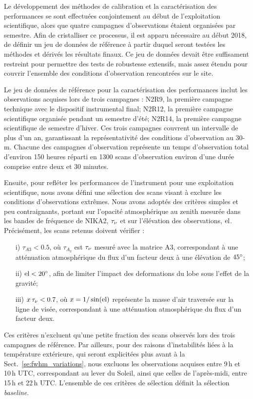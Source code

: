 Le développement des méthodes de calibration et la caractérisation
des performances se sont effectuées conjointement au début de
l'exploitation scientifique, alors que quatre campagnes d'observations
étaient organisées par semestre. Afin de cristalliser ce processus, il
est apparu nécessaire au début 2018, de définir un jeu de données de
référence à partir duquel seront testées les méthodes et dérivés les
résultats finaux. Ce jeu de données devait être suffisament restreint
pour permettre des tests de robustesse extensifs, mais assez étendu
pour couvrir l'ensemble des conditions d'observation rencontrées sur
le site.

Le jeu de données de référence pour la caractérisation des
performances inclut les observations acquises lors de trois campagnes
: N2R9, la première campagne technique avec le dispositif
instrumental final; N2R12, la première campagne scientifique
organisée pendant un semestre d'été; N2R14, la première campagne
scientifique de semestre d'hiver. Ces trois campagnes couvrent un
intervalle de plus d'un an, garantissant la représentativité des
conditions d'observation au 30-m. Chacune des campagnes d'observation
représente un temps d'observation total d'environ 150 heures réparti
en 1300 scans d'observation environ d'une durée comprise entre
deux et 30 minutes.

Ensuite, pour refléter les performances de l'instrument pour une
exploitation scientifique, nous avons défini une sélection des scans
visant à exclure les conditions d'observations extrêmes. Nous avons
adoptés des critères simples et peu contraignants, portant sur l'opacité
atmosphérique au zenith mesurée dans les bandes de fréquence de NIKA2,
$\tau_{\nu}$ et sur l'élévation des observations, $\rm{el}$. Précisément,
les scans retenus doivent vérifier :
\begin{itemize}
  \item[i)]{$\tau_{A3} < 0.5$, où $\tau_{A_3}$ est $\tau_{\nu}$ mesuré
    avec la matrice A3, correspondant à une atténuation atmosphérique
    du flux d'un facteur deux à une élévation de $45^{\circ}$;}
  \item[ii)]{$\rm{el} < 20^{\circ}$, afin de limiter l'impact des deformations du lobe
    sous l'effet de la gravité;}
  \item[iii)]{$x\, \tau_{\nu} < 0.7$, où $x = 1/\sin(\rm{el})$ représente la
    masse d'air traversée sur la ligne de visée, correspondant à une
    atténuation atmosphérique du flux d'un facteur deux.}
\end{itemize}

Ces critères n'excluent qu'une petite fraction des scans observés lors
des trois campagnes de référence. {\color{bleu}{ESTIMER CETTE
    FRACTION ?}}
Par ailleurs, pour des raisons d'instabilités liées à la température
extérieure, qui seront explicitées plus avant à la
Sect.~\ref{se:fwhm_variations}, nous excluons les observations
acquises entre 9\,h et 10\,h UTC, correspondant au lever du Soleil,
ainsi que celles de l'après-midi, entre 15\,h et 22\,h UTC. L'ensemble
de ces critères de sélection définit la sélection \emph{baseline}. 


